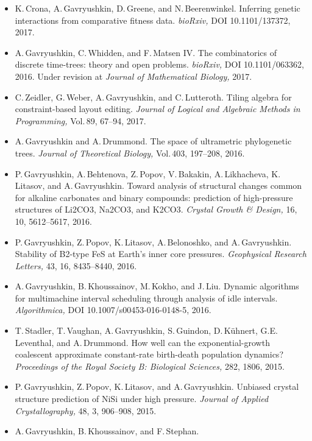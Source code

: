\documentclass[12pt]{article}
\begin{document}
\iftoggle{full}{
\centerline{\bf Publications}
}{
\newpage
\centerline{\bf Recent publications}
}
\begin{itemize}
\item K.\,Crona, A.\,Gavryushkin, D.\,Greene, and N.\,Beerenwinkel.
	Inferring genetic interactions from comparative fitness data.
	{\em bioRxiv,} DOI 10.1101/137372, 2017.
\item A.\,Gavryushkin, C.\,Whidden, and F.\,Matsen IV.
	The combinatorics of discrete time-trees: theory and open problems.
	{\em bioRxiv,} DOI 10.1101/063362, 2016.
	Under revision at {\em Journal of Mathematical Biology,} 2017.
\item C.\,Zeidler, G.\,Weber, A.\,Gavryushkin, and C.\,Lutteroth.
	Tiling algebra for constraint-based layout editing.
	{\em Journal of Logical and Algebraic Methods in Programming,} Vol.\,89, 67--94, 2017.
\item A.\,Gavryushkin and A.\,Drummond.
	The space of ultrametric phylogenetic trees.
	{\em Journal of Theoretical Biology,} Vol.\,403, 197--208, 2016.
\item P.\,Gavryushkin, A.\,Behtenova, Z.\,Popov, V.\,Bakakin, A.\,Likhacheva, K.\,Litasov, and A.\,Gavryushkin.
	Toward analysis of structural changes common for alkaline carbonates and binary compounds: prediction of high-pressure structures of Li2CO3, Na2CO3, and K2CO3.
	{\em Crystal Growth \& Design,} 16, 10, 5612--5617, 2016.
\item P.\,Gavryushkin, Z.\,Popov, K.\,Litasov, A.\,Belonoshko, and A.\,Gavryushkin.
	Stability of B2-type FeS at Earth's inner core pressures.
	{\em Geophysical Research Letters,} 43, 16, 8435--8440, 2016.
\item A.\,Gavryushkin, B.\,Khoussainov, M.\,Kokho, and J.\,Liu.
	Dynamic algorithms for multimachine interval scheduling through analysis of idle intervals.
	{\em Algorithmica,} DOI 10.1007/s00453-016-0148-5, 2016.
\item T.\,Stadler, T.\,Vaughan, A.\,Gavryushkin, S.\,Guindon, D.\,K\"uhnert, G.E.\,Leventhal, and A.\,Drummond.
	How well can the exponential-growth coalescent approximate constant-rate birth-death population dynamics?
	{\em Proceedings of the Royal Society B: Biological Sciences,} 282, 1806, 2015.
\item P.\,Gavryushkin, Z.\,Popov, K.\,Litasov, and A.\,Gavryushkin.
	Unbiased crystal structure prediction of $\mathrm{NiSi}$ under high pressure.
	{\em Journal of Applied Crystallography,} 48, 3, 906--908, 2015.
\item A.\,Gavryushkin, B.\,Khoussainov, and F.\,Stephan.

\end{itemize}
\end{document}
